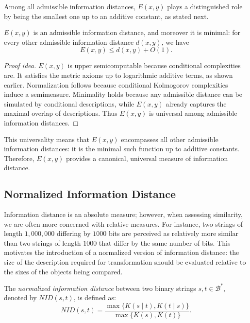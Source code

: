 Among all admissible information distances, $E(x,y)$ plays a distinguished role by being the smallest one up to an additive constant, as stated next.

\begin{proposition}
$E(x,y)$ is an admissible information distance, and moreover it is minimal: for every other admissible information distance $d(x,y)$, we have
\[
E(x,y) \leq d(x,y) + O(1).
\]
\end{proposition}
\begin{proof}[Proof idea]
$E(x,y)$ is upper semicomputable because conditional complexities are. 
It satisfies the metric axioms up to logarithmic additive terms, as shown earlier. 
Normalization follows because conditional Kolmogorov complexities induce a semimeasure. 
Minimality holds because any admissible distance can be simulated by conditional descriptions, while $E(x,y)$ already captures the maximal overlap of descriptions. 
Thus $E(x,y)$ is universal among admissible information distances.
\end{proof}

This universality means that $E(x,y)$ encompasses all other admissible information distances: it is the minimal such function up to additive constants. Therefore, $E(x,y)$ provides a canonical, universal measure of information distance.


\subsection*{Normalized Information Distance}

Information distance is an absolute measure; however, when assessing similarity, we are often more concerned with relative measures. For instance, two strings of length $1{,}000{,}000$ differing by $1000$ bits are perceived as relatively more similar than two strings of length $1000$ that differ by the same number of bits. This motivates the introduction of a normalized version of information distance: the size of the description required for transformation should be evaluated relative to the sizes of the objects being compared.

\begin{definition}
The \emph{normalized information distance} between two binary strings $s, t \in \mathcal{B}^{\ast}$, denoted by $NID(s,t)$, is defined as:
\[
NID(s, t) = \frac{\max\{ K(s \mid t), K(t \mid s) \}}{\max \{ K(s), K(t) \} }.
\]
\end{definition}

